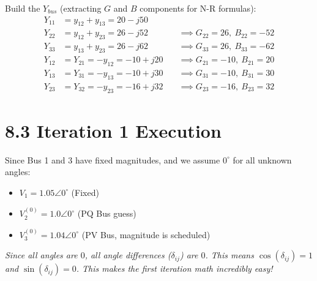 \documentclass[11pt]{article}
\begin{document}
Build the $Y_{bus}$ (extracting $G$ and $B$ components for N-R formulas):
\begin{align*}
    Y_{11} &= y_{12} + y_{13} = 20 - j50 \\
    Y_{22} &= y_{12} + y_{23} = 26 - j52 \quad &\implies G_{22} = 26, \ B_{22} = -52 \\
    Y_{33} &= y_{13} + y_{23} = 26 - j62 \quad &\implies G_{33} = 26, \ B_{33} = -62 \\
    Y_{12} &= Y_{21} = -y_{12} = -10 + j20 \quad &\implies G_{21} = -10, \ B_{21} = 20 \\
    Y_{13} &= Y_{31} = -y_{13} = -10 + j30 \quad &\implies G_{31} = -10, \ B_{31} = 30 \\
    Y_{23} &= Y_{32} = -y_{23} = -16 + j32 \quad &\implies G_{23} = -16, \ B_{23} = 32
\end{align*}

\newpage
\section*{8.3 Iteration 1 Execution}

\begin{stepbox}
Since Bus 1 and 3 have fixed magnitudes, and we assume $0^\circ$ for all unknown angles:
\begin{itemize}
    \item $V_1 = 1.05 \angle 0^\circ$ (Fixed)
    \item $V_2^{(0)} = 1.0 \angle 0^\circ$ (PQ Bus guess)
    \item $V_3^{(0)} = 1.04 \angle 0^\circ$ (PV Bus, magnitude is scheduled)
\end{itemize}
\textit{Since all angles are $0$, all angle differences ($\delta_{ij}$) are $0$. This means $\cos(\delta_{ij}) = 1$ and $\sin(\delta_{ij}) = 0$. This makes the first iteration math incredibly easy!}
\end{stepbox}
\end{document}
